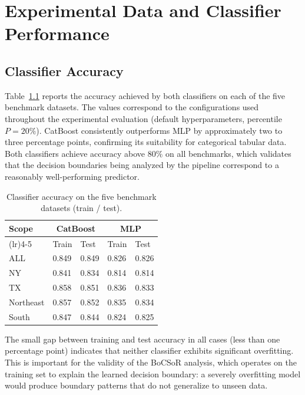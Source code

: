 \chapter{Experimental Data and Classifier Performance}
\label{app:experimental-data}

\section{Classifier Accuracy}
\label{app:classifier-accuracy}

Table~\ref{tab:classifier-accuracy} reports the accuracy achieved by both classifiers on each of the five benchmark datasets. The values correspond to the configurations used throughout the experimental evaluation (default hyperparameters, percentile $P = 20\%$). CatBoost consistently outperforms MLP by approximately two to three percentage points, confirming its suitability for categorical tabular data. Both classifiers achieve accuracy above $80\%$ on all benchmarks, which validates that the decision boundaries being analyzed by the pipeline correspond to a reasonably well-performing predictor.

\begin{table}[htbp]
\centering
\renewcommand{\arraystretch}{1.2}
\caption{Classifier accuracy on the five benchmark datasets (train / test).}
\label{tab:classifier-accuracy}
\begin{tabular}{>{\raggedright\arraybackslash}p{} p{} p{} p{} p{}}
  \toprule
  \textbf{Scope} & \multicolumn{2}{c}{\textbf{CatBoost}} & \multicolumn{2}{c}{\textbf{MLP}} \\
  \cmidrule(lr){2-3} \cmidrule(lr){4-5}
  & Train & Test & Train & Test \\
  \midrule
  ALL       & 0.849 & 0.849 & 0.826 & 0.826 \\
  NY        & 0.841 & 0.834 & 0.814 & 0.814 \\
  TX        & 0.858 & 0.851 & 0.836 & 0.833 \\
  Northeast & 0.857 & 0.852 & 0.835 & 0.834 \\
  South     & 0.847 & 0.844 & 0.824 & 0.825 \\
  \bottomrule
\end{tabular}
\renewcommand{\arraystretch}{1.0}
\end{table}

The small gap between training and test accuracy in all cases (less than one percentage point) indicates that neither classifier exhibits significant overfitting. This is important for the validity of the BoCSoR analysis, which operates on the training set to explain the learned decision boundary: a severely overfitting model would produce boundary patterns that do not generalize to unseen data.

